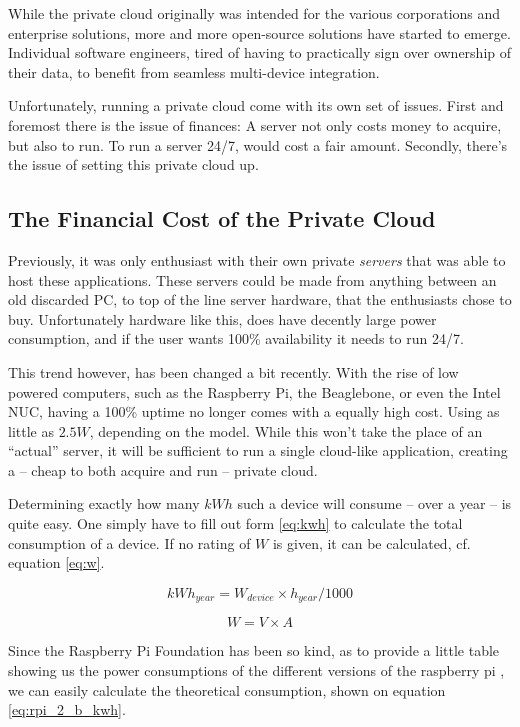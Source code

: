 		While the private cloud originally was intended for the various corporations and enterprise solutions, more and more open-source solutions have started to emerge. Individual software engineers, tired of having to practically sign over ownership of their data, to benefit from seamless multi-device integration. 

		Unfortunately, running a private cloud come with its own set of issues. First and foremost there is the issue of finances: A server not only costs money to acquire, but also to run. To run a server 24/7, would cost a fair amount. Secondly, there's the issue of setting this private cloud up. 

		\subsection*{The Financial Cost of the Private Cloud}
			Previously, it was only enthusiast with their own private \emph{servers} that was able to host these applications. These servers could be made from anything between an old discarded PC, to top of the line server hardware, that the enthusiasts chose to buy. Unfortunately hardware like this, does have decently large power consumption, and if the user wants 100\% availability it needs to run 24/7.

			This trend however, has been changed a bit recently. With the rise of low powered computers, such as the Raspberry Pi, the Beaglebone, or even the Intel NUC, having a 100\% uptime no longer comes with a equally high cost. Using as little as $2.5W$, depending on the model. While this won't take the place of an ``actual'' server, it will be sufficient to run a single cloud-like application, creating a -- cheap to both acquire and run -- private cloud.

			Determining exactly how many $kWh$ such a device will consume -- over a year -- is quite easy. One simply have to fill out form \ref{eq:kwh} to calculate the total consumption of a device. If no rating of $W$ is given, it can be calculated, cf. equation \ref{eq:w}.

			\begin{equation}
				kWh_{year} = W_{device} \times h_{year} / 1000
				\label{eq:kwh}
			\end{equation}

			\begin{equation}
				W = V \times A
				\label{eq:w}
			\end{equation}

			Since the Raspberry Pi Foundation has been so kind, as to provide a little table showing us the power consumptions of the different versions of the raspberry pi \cite{raspberrypi_power}, we can easily calculate the theoretical consumption, shown on equation \ref{eq:rpi_2_b_kwh}.


